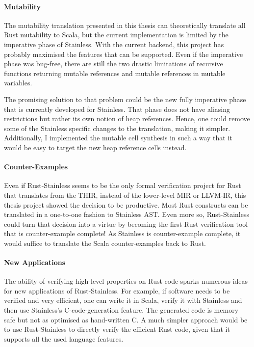 \paragraph{Mutability}

The mutability translation presented in this thesis can theoretically translate
all Rust mutability to Scala, but the current implementation is limited by the
imperative phase of Stainless. With the current backend, this project has
probably maximised the features that can be supported. Even if the imperative
phase was bug-free, there are still the two drastic limitations of recursive
functions returning mutable references and mutable references in mutable
variables.

The promising solution to that problem could be the new fully imperative phase
that is currently developed for Stainless. That phase does not have aliasing
restrictions but rather its own notion of heap references. Hence, one could
remove some of the Stainless specific changes to the translation, making it
simpler. Additionally, I implemented the mutable cell synthesis in such a way
that it would be easy to target the new heap reference cells instead.


\paragraph{Counter-Examples}

Even if Rust-Stainless seems to be the only formal verification project for Rust
that translates from the THIR, instead of the lower-level MIR or LLVM-IR, this
thesis project showed the decision to be productive. Most Rust constructs can be
translated in a one-to-one fashion to Stainless AST. Even more so,
Rust-Stainless could turn  that decision into a virtue by becoming the first
Rust verification tool that is counter-example complete! As Stainless is
counter-example complete, it would suffice to translate the Scala
counter-examples back to Rust.



\paragraph{New Applications}

The ability of verifying high-level properties on Rust code sparks numerous
ideas for new applications of Rust-Stainless. For example, if software needs to
be verified and very efficient, one can write it in Scala, verify it with
Stainless and then use Stainless's C-code-generation feature. The generated code
is memory safe but not as optimised as hand-written C. A much simpler approach
would be to use Rust-Stainless  to directly verify the efficient Rust code,
given that it supports all the used language features.

